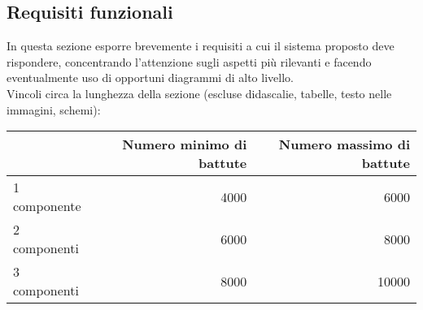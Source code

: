 \subsection*{Requisiti funzionali}
In questa sezione esporre brevemente i requisiti a cui il sistema proposto deve rispondere, concentrando l'attenzione sugli aspetti più rilevanti e facendo eventualmente uso di opportuni diagrammi di alto livello.\\

Vincoli circa la lunghezza della sezione (escluse didascalie, tabelle, testo nelle immagini, schemi):

\vspace{1cm}
\begin{tabular}{l|rr}
                 & Numero minimo di battute & Numero massimo di battute \\
    \hline
    1 componente & 4000                     & 6000                      \\
    2 componenti & 6000                     & 8000                      \\
    3 componenti & 8000                     & 10000                     \\
    \hline
\end{tabular}


\newpage
